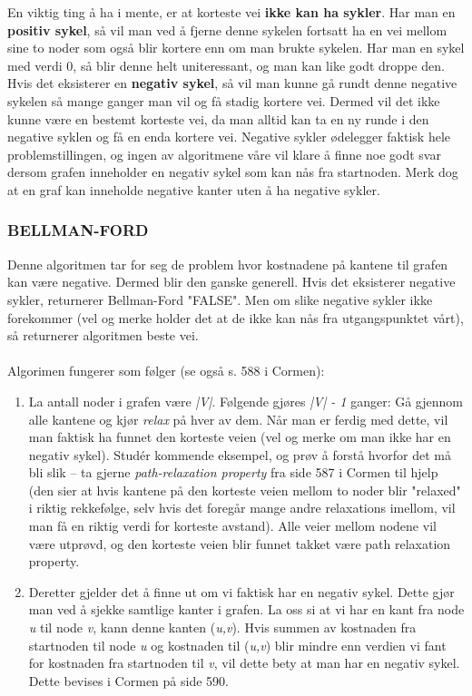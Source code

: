 \noindent En viktig ting å ha i mente, er at korteste vei \textbf{ikke kan ha sykler}. Har man en \textbf{positiv sykel}, så vil man ved å fjerne denne sykelen fortsatt ha en vei mellom sine to noder som også blir kortere enn om man brukte sykelen. Har man en sykel med verdi 0, så blir denne helt uniteressant, og man kan like godt droppe den. Hvis det eksisterer en \textbf{negativ sykel}, så vil man kunne gå rundt denne negative sykelen så mange ganger man vil og få stadig kortere vei. Dermed vil det ikke kunne være en bestemt korteste vei, da man alltid kan ta en ny runde i den negative syklen og få en enda kortere vei. Negative sykler ødelegger faktisk hele problemstillingen, og ingen av algoritmene våre vil klare å finne noe godt svar dersom grafen inneholder en negativ sykel som kan nås fra startnoden. Merk dog at en graf kan inneholde negative kanter uten å ha negative sykler.

\subsubsection{BELLMAN-FORD}
Denne algoritmen tar for seg de problem hvor kostnadene på kantene til grafen kan være negative. Dermed blir den ganske generell. Hvis det eksisterer negative sykler, returnerer Bellman-Ford "FALSE". Men om slike negative sykler ikke forekommer (vel og merke holder det at de ikke kan nås fra utgangspunktet vårt), så returnerer algoritmen beste vei.
\\\\
Algorimen fungerer som følger (se også s. 588 i Cormen):
\begin{enumerate}
    \item La antall noder i grafen være \textit{|V|}. Følgende gjøres \textit{|V| - 1} ganger: Gå gjennom alle kantene og kjør \textit{relax} på hver av dem. Når man er ferdig med dette, vil man faktisk ha funnet den korteste veien (vel og merke om man ikke har en negativ sykel). Studér kommende eksempel, og prøv å forstå hvorfor det må bli slik – ta gjerne \textit{path-relaxation property} fra side 587 i Cormen til hjelp (den sier at hvis kantene på den korteste veien mellom to  noder blir "relaxed" i riktig rekkefølge, selv hvis det foregår mange andre relaxations imellom, vil man få en riktig verdi for korteste avstand). Alle veier mellom nodene vil være utprøvd, og den korteste veien blir funnet takket være path relaxation property.
    \item Deretter gjelder det å finne ut om vi faktisk har en negativ sykel. Dette gjør man ved å sjekke samtlige kanter i grafen. La oss si at vi har en kant fra node \textit{u} til node \textit{v}, kann denne kanten (\textit{u,v}). Hvis summen av kostnaden fra startnoden til node \textit{u} og kostnaden til (\textit{u,v}) blir mindre enn verdien vi fant for kostnaden fra startnoden til \textit{v}, vil dette bety at man har en negativ sykel. Dette bevises i Cormen på side 590.
\end{enumerate}

